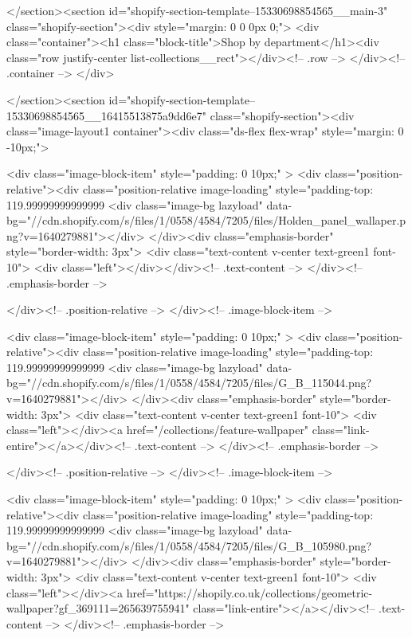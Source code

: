 {{{{{{{</section><section id="shopify-section-template--15330698854565__main-3" class="shopify-section"><div style="margin: 0 0 0px 0;">
  <div class="container"><h1 class="block-title">Shop by department</h1><div class="row justify-center list-collections__rect"></div><!-- .row -->
  </div><!-- .container -->
</div>


</section><section id="shopify-section-template--15330698854565__16415513875a9dd6e7" class="shopify-section"><div class="image-layout1 container"><div class="ds-flex flex-wrap" style="margin: 0 -10px;">

        <div class="image-block-item" style="padding: 0 10px;" >
          <div class="position-relative"><div class="position-relative image-loading" style="padding-top: 119.99999999999999%
                <div class="image-bg lazyload" data-bg="//cdn.shopify.com/s/files/1/0558/4584/7205/files/Holden_panel_wallaper.png?v=1640279881"></div>
              </div><div class="emphasis-border" style="border-width: 3px">
              <div class="text-content v-center text-green1 font-10">
                <div class="left"></div></div><!-- .text-content -->
            </div><!-- .emphasis-border -->

          </div><!-- .position-relative -->
        </div><!-- .image-block-item -->

        <div class="image-block-item" style="padding: 0 10px;" >
          <div class="position-relative"><div class="position-relative image-loading" style="padding-top: 119.99999999999999%
                <div class="image-bg lazyload" data-bg="//cdn.shopify.com/s/files/1/0558/4584/7205/files/G_B_115044.png?v=1640279881"></div>
              </div><div class="emphasis-border" style="border-width: 3px">
              <div class="text-content v-center text-green1 font-10">
                <div class="left"></div><a href="/collections/feature-wallpaper" class="link-entire"></a></div><!-- .text-content -->
            </div><!-- .emphasis-border -->

          </div><!-- .position-relative -->
        </div><!-- .image-block-item -->

        <div class="image-block-item" style="padding: 0 10px;" >
          <div class="position-relative"><div class="position-relative image-loading" style="padding-top: 119.99999999999999%
                <div class="image-bg lazyload" data-bg="//cdn.shopify.com/s/files/1/0558/4584/7205/files/G_B_105980.png?v=1640279881"></div>
              </div><div class="emphasis-border" style="border-width: 3px">
              <div class="text-content v-center text-green1 font-10">
                <div class="left"></div><a href="https://shopily.co.uk/collections/geometric-wallpaper?gf_369111=265639755941" class="link-entire"></a></div><!-- .text-content -->
            </div><!-- .emphasis-border -->

}}}}}}}
